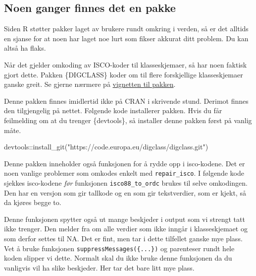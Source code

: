\documentclass[
  letterpaper,
  DIV=11,
  numbers=noendperiod]{scrreprt}
\newenvironment{Shaded}{\begin{snugshade}}{\end{snugshade}}
\newcommand{\FunctionTok}[1]{\textcolor[rgb]{0.28,0.35,0.67}{#1}}
\newcommand{\NormalTok}[1]{\textcolor[rgb]{0.00,0.23,0.31}{#1}}
\newcommand{\SpecialCharTok}[1]{\textcolor[rgb]{0.37,0.37,0.37}{#1}}
\newcommand{\StringTok}[1]{\textcolor[rgb]{0.13,0.47,0.30}{#1}}
\theoremstyle{definition}
\theoremstyle{remark}
\begin{document}
\hypertarget{noen-ganger-finnes-det-en-pakke}{%
\subsection{Noen ganger finnes det en
pakke}\label{noen-ganger-finnes-det-en-pakke}}

Siden R støtter pakker laget av brukere rundt omkring i verden, så er
det alltids en sjanse for at noen har laget noe lurt som fikser akkurat
ditt problem. Du kan altså ha flaks.

Når det gjelder omkoding av ISCO-koder til klasseskjemaer, så har noen
faktisk gjort dette. Pakken \{DIGCLASS\} koder om til flere forskjellige
klasseskjemaer ganske greit. Se gjerne nærmere på
\href{https://digclass.pages.code.europa.eu/digclass/index.html}{vignetten
til pakken}.

Denne pakken finnes imidlertid ikke på CRAN i skrivende stund. Derimot
finnes den tilgjengelig på nettet. Følgende kode installerer pakken.
Hvis du får feilmelding om at du trenger \{devtools\}, så installer
denne pakken først på vanlig måte.

\begin{Shaded}
\begin{Highlighting}[]
\NormalTok{devtools}\SpecialCharTok{::}\FunctionTok{install\_git}\NormalTok{(}\StringTok{"https://code.europa.eu/digclass/digclass.git"}\NormalTok{)}
\end{Highlighting}
\end{Shaded}

Denne pakken inneholder også funksjonen for å rydde opp i isco-kodene.
Det er noen vanlige problemer som omkodes enkelt med
\texttt{repair\_isco}. I følgende kode sjekkes isco-kodene \emph{før}
funksjonen \texttt{isco88\_to\_ordc} brukes til selve omkodingen. Den
har en versjon som gir tallkode og en som gir tekstverdier, som er
kjekt, så da kjøres begge to.

Denne funksjonen spytter også ut mange beskjeder i output som vi strengt
tatt ikke trenger. Den melder fra om alle verdier som ikke inngår i
klasseskjemaet og som derfor settes til NA. Det er fint, men tar i dette
tilfellet ganske mye plass. Vet å bruke funksjonen
\texttt{suppressMessages(\{...\})} og parenteser rundt hele koden
slipper vi dette. Normalt skal du ikke bruke denne funksjonen da du
vanligvis vil ha slike beskjeder. Her tar det bare litt mye plass.
\end{document}
